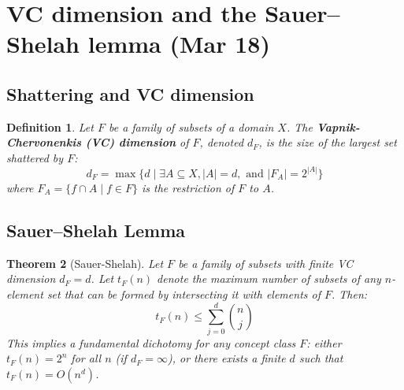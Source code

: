 \documentclass[a4paper]{article}
\newtheorem{thm}{Theorem}[section]
\newtheorem{defn}[thm]{Definition}
\begin{document}
\section{VC dimension and the Sauer--Shelah lemma (Mar 18)}

\subsection{Shattering and VC dimension}

\begin{defn}
    Let $F$ be a family of subsets of a domain $X$. The \textbf{Vapnik-Chervonenkis (VC) dimension} of $F$, denoted $d_F$, is the size of the largest set shattered by $F$:
    \[
        d_F = \max \{d \mid \exists A \subseteq X, |A| = d, \text{ and } |F_A| = 2^{|A|}\}
    \]
    where $F_A = \{f \cap A \mid f \in F\}$ is the restriction of $F$ to $A$.
\end{defn}

\subsection{Sauer--Shelah Lemma}

\begin{thm}[Sauer-Shelah]
    Let $F$ be a family of subsets with finite VC dimension $d_F = d$. Let $t_F(n)$ denote the maximum number of subsets of any $n$-element set that can be formed by intersecting it with elements of $F$. Then:
    \[
        t_F(n) \leq \sum_{j=0}^{d} \binom{n}{j}
    \]
    This implies a fundamental dichotomy for any concept class $F$: either $t_F(n) = 2^n$ for all $n$ (if $d_F = \infty$), or there exists a finite $d$ such that $t_F(n) = O(n^d)$.
\end{thm}
\end{document}

